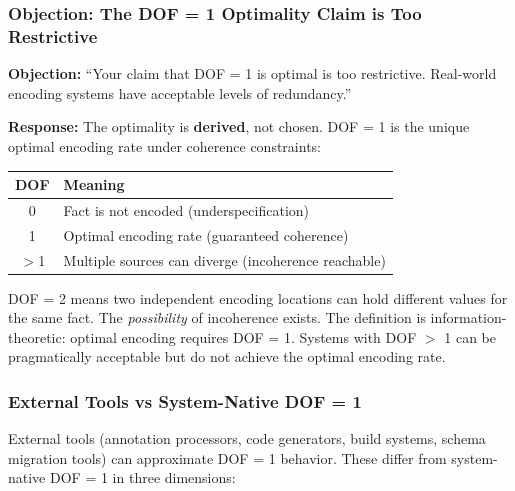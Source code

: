 
\subsubsection{Objection: The DOF = 1 Optimality Claim is Too Restrictive}

\textbf{Objection:} ``Your claim that DOF = 1 is optimal is too restrictive. Real-world encoding systems have acceptable levels of redundancy.''

\textbf{Response:} The optimality is \textbf{derived}, not chosen. DOF = 1 is the unique optimal encoding rate under coherence constraints: 

\begin{center}
\begin{tabular}{cl}
\toprule
\textbf{DOF} & \textbf{Meaning} \\
\midrule
0 & Fact is not encoded (underspecification) \\
1 & Optimal encoding rate (guaranteed coherence) \\
$>$1 & Multiple sources can diverge (incoherence reachable) \\
\bottomrule
\end{tabular}
\end{center}

DOF = 2 means two independent encoding locations can hold different values for the same fact. The \emph{possibility} of incoherence exists. The definition is information-theoretic: optimal encoding requires DOF = 1. Systems with DOF $>$ 1 can be pragmatically acceptable but do not achieve the optimal encoding rate. 

\subsubsection{External Tools vs System-Native DOF = 1}

External tools (annotation processors, code generators, build systems, schema migration tools) can approximate DOF = 1 behavior. These differ from system-native DOF = 1 in three dimensions:

